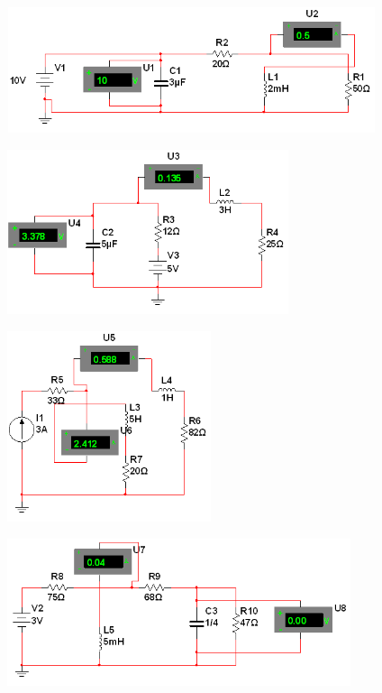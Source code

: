 \documentclass[10pt]{article}
\begin{document}
\begin{center}
	\includegraphics[width=10.82cm, height=3.68cm]{Imagenes/1.png}
\end{center}
\begin{center}
	\includegraphics[width=8.26cm, height=4.83cm]{Imagenes/2.png}
\end{center}
\begin{center}
	\includegraphics[width=5.97cm, height=5.59cm]{Imagenes/3.png}
\end{center}
\begin{center}
	\includegraphics[width=10.08cm, height=4.32cm]{Imagenes/4.png}
\end{center}
\end{document}
